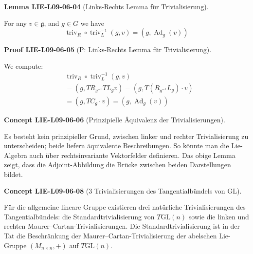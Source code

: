 \documentclass[10pt, letterpaper]{article}
\newcommand{\GL}{\mathrm{GL}}
\newcommand{\CustomHeading}[3]{%
  \par\medskip\noindent%
  \textbf{#1 #2} \textnormal{(#3)}.\enskip%
}
\newenvironment{LEM}[2]{\CustomHeading{Lemma}{#1}{#2}}{}
\newenvironment{CONC}[2]{\CustomHeading{Concept}{#1}{#2}}{}
\newenvironment{PROOF}[2]{\CustomHeading{Proof}{#1}{#2}}{}
\begin{document}
\begin{LEM}{LIE-L09-06-04}{Links-Rechts Lemma für Trivialisierung}
For any $v \in \mathfrak{g}$, and $g \in G$ we have
$$
\operatorname{triv}_{R} \circ \operatorname{triv}_{L}^{-1}(g, v)=\left(g, \operatorname{Ad}_{g}(v)\right)
$$
\end{LEM}

\begin{PROOF}{LIE-L09-06-05}{P: Links-Rechts Lemma für Trivialisierung}
We compute:
$$
\begin{aligned}
& \operatorname{triv}_{R} \circ \operatorname{triv}_{L}^{-1}(g, v) \\
& =\left(g, T R_{g^{-1}} T L_{g} v\right)=\left(g, T\left(R_{g^{-1}} L_{g}\right) \cdot v\right) \\
& =\left(g, T C_{g} \cdot v\right)=\left(g, \operatorname{Ad}_{g}(v)\right)
\end{aligned}
$$
\end{PROOF}

\begin{CONC}{LIE-L09-06-06}{Prinzipielle Äquivalenz der Trivialisierungen}
Es besteht kein prinzipieller Grund, zwischen linker und rechter
Trivialisierung zu unterscheiden; beide liefern äquivalente Beschreibungen.
So könnte man die Lie-Algebra auch über rechtsinvariante Vektorfelder
definieren. Das obige Lemma zeigt, dass die Adjoint-Abbildung
die Brücke zwischen beiden Darstellungen bildet.
\end{CONC}

\begin{CONC}{LIE-L09-06-08}{3 Trivialisierungen des Tangentialbündels von $\GL$}
Für die allgemeine lineare Gruppe existieren drei natürliche
Trivialisierungen des Tangentialbündels:
die Standardtrivialisierung von $T\GL(n)$
sowie die linken und rechten Maurer--Cartan-Trivialisierungen.
Die Standardtrivialisierung ist in der Tat die Beschränkung
der Maurer--Cartan-Trivialisierung der abelschen Lie-Gruppe
$(M_{n\times n},+)$ auf $T\GL(n)$.
\end{CONC}
\end{document}
